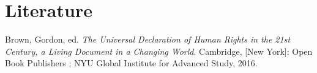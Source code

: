 \documentclass[
  titlepage,
  openright,
  DIV=calc,
  toc=listof,
  listof=nochaptergap]{scrbook}
\newlength{\cslhangindent}
\newlength{\cslentryspacingunit} %
\newenvironment{CSLReferences}[2] %
 {%
  \setlength{\parindent}{0pt}
  \ifodd #1
  \let\oldpar\par
  \def\par{\hangindent=\cslhangindent\oldpar}
  \fi
  \setlength{\parskip}{#2\cslentryspacingunit}
 }%
 {}
\begin{document}
\clearpage

\hypertarget{literature}{%
\section{Literature}\label{literature}}

\hypertarget{refs_main}{}
\begin{CSLReferences}{1}{0}
\leavevmode{}%
Brown, Gordon, ed. \emph{The {Universal} {Declaration} of {Human}
{Rights} in the 21st Century, a Living Document in a Changing World}.
Cambridge, {[}New York{]}: Open Book Publishers ; NYU Global Institute
for Advanced Study, 2016.

\end{CSLReferences}

\backmatter
\end{document}
